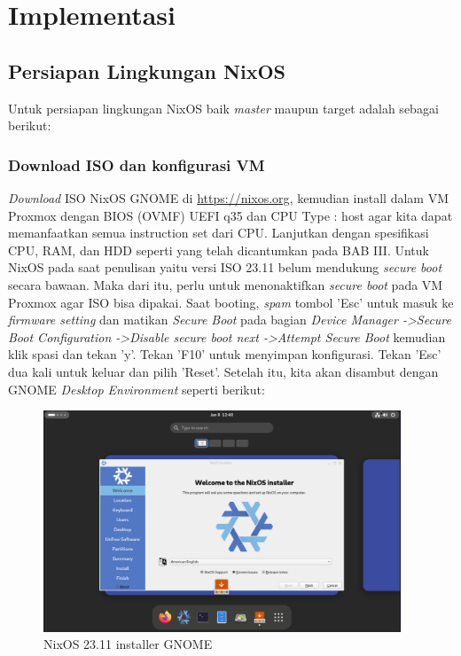 \documentclass[10pt,]{report}
\begin{document}
\section{Implementasi}
\begin{adjustwidth}{20pt}{}
	\subsection{Persiapan Lingkungan NixOS}
	\begin{adjustwidth}{20pt}{}
		Untuk persiapan lingkungan NixOS baik \textit{master} maupun target
		adalah sebagai berikut:
	\end{adjustwidth}
	\subsubsection{Download ISO dan konfigurasi VM}
	\begin{adjustwidth}{20pt}{}
		\textit{Download} ISO NixOS GNOME di \url{https://nixos.org}, kemudian
		install dalam VM Proxmox dengan BIOS (OVMF) UEFI q35 dan CPU Type : host
		agar kita dapat memanfaatkan semua instruction set dari CPU. Lanjutkan
		dengan spesifikasi CPU, RAM, dan HDD seperti yang telah dicantumkan pada
		BAB III. Untuk NixOS pada saat penulisan yaitu versi ISO 23.11 belum
		mendukung \textit{secure boot} secara bawaan. Maka dari itu, perlu untuk
		menonaktifkan \textit{secure boot} pada VM Proxmox agar ISO bisa dipakai.
		Saat booting, \textit{spam} tombol 'Esc' untuk masuk ke \textit{firmware setting} dan
		matikan \textit{Secure Boot} pada bagian \textit{Device Manager
			-\textgreater Secure Boot Configuration -\textgreater Disable secure boot
			next -\textgreater Attempt Secure Boot} kemudian klik spasi dan tekan 'y'.
		Tekan 'F10' untuk menyimpan konfigurasi. Tekan 'Esc' dua kali untuk keluar
		dan pilih 'Reset'. Setelah itu, kita akan disambut dengan GNOME
		\textit{Desktop Environment} seperti berikut:
		\begin{figure}[H]
			\begin{center}
				\includegraphics[width=0.95\textwidth]{images/nixos-23.11-installer.png}
			\end{center}
			\caption{NixOS 23.11 installer GNOME}
		\end{figure}
	\end{adjustwidth}

\end{adjustwidth}
\end{document}
